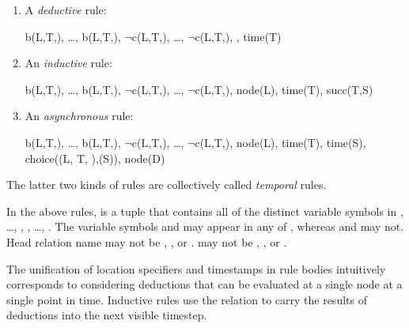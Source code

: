 \begin{enumerate}
\item 
A {\em deductive} rule:

\begin{Drules}
        {b(L,T,), \ldots, b(L,T,), $\lnot$c(L,T,), \ldots, $\lnot$c(L,T,), , time(T)}
\end{Drules}
\item 
An {\em inductive} rule:

\begin{Drules}
        {b(L,T,), \ldots, b(L,T,), $\lnot$c(L,T,), \ldots, $\lnot$c(L,T,), node(L), time(T), succ(T,S)}
\end{Drules}
\item 
An {\em asynchronous} rule:

\begin{Drules}
        {b(L,T,), \ldots, b(L,T,),
          $\lnot$c(L,T,), \ldots, $\lnot$c(L,T,),
          node(L), time(T), time(S), choice((L, T, ),(S)), node(D)}
\end{Drules}
\end{enumerate}
The latter two kinds of rules are collectively called {\em temporal} rules.

In the above rules,  is a tuple that contains all of the distinct variable
symbols in , \ldots, , , \ldots,
.  The variable symbols  and  may appear in
any of , whereas  and  may not.
Head relation name  may not be , , or .
 may not be
, , or \dedalus{<}. %

The unification of location specifiers and timestamps in rule bodies intuitively corresponds to considering deductions that can be evaluated at a single node at a single point in time.  Inductive rules use the  relation to carry the results of deductions into the next visible timestep.

